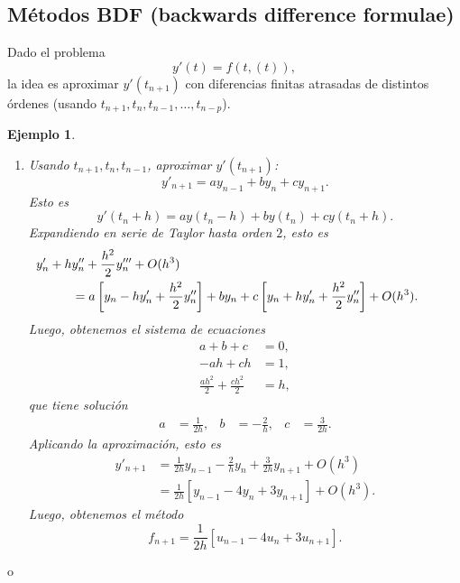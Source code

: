 \documentclass[11pt,letterpaper]{report}
\newtheorem{example}{Ejemplo}
\begin{document}
\subsection{Métodos BDF (backwards difference formulae)}

Dado el problema
\begin{equation}
  y'(t)=f(t,(t))
,\end{equation}
la idea es aproximar $y'(t_{n+1})$ con diferencias finitas atrasadas
de distintos órdenes (usando $t_{n+1},t_{n},t_{n-1},\dots,t_{n-p}$).

\begin{example}
  \begin{enumerate}
    \item
      Usando $t_{n+1},t_{n},t_{n-1}$, aproximar $y'(t_{n+1})$:
      \begin{equation}
        y'_{n+1} = ay_{n-1} + by_{n} + cy_{n+1}
      .\end{equation}
      Esto es
      \begin{equation}
        y'(t_{n}+h)
        = ay(t_{n}-h) + by(t_{n}) + cy(t_n+h)
      .\end{equation}
      Expandiendo en serie de Taylor hasta orden $2$, esto es
      \begin{align}
        &\hspace{-10mm}
        y'_n + hy''_n + \frac{h^{2}}{2}y'''_n + O(h^{3}) \\
        &= a \left[y_n - h y'_n + \frac{h^{2}}{2}y''_n\right]
        + b y_n
        + c \left[y_n + hy'_n + \frac{h^{2}}{2}y''_n\right]
        + O(h^{3})
      .\end{align}
      Luego, obtenemos el sistema de ecuaciones
      \begin{align}
        a+b+c &= 0, \\
        -ah+ch &= 1, \\
        \frac{ah^{2}}{2} + \frac{ch^{2}}{2} &= h,
      \end{align}
      que tiene solución
      \begin{align}
        a &= \frac{1}{2h}, &
        b &= -\frac{2}{h}, &
        c &= \frac{3}{2h}.
      \end{align}
      Aplicando la aproximación, esto es
      \begin{align}
        y'_{n+1}
        &= \frac{1}{2h}y_{n-1} - \frac{2}{h}y_n + \frac{3}{2h}y_{n+1}
        + O(h^{3})
        \\
        &= \frac{1}{2h}[y_{n-1} - 4y_n + 3y_{n+1}] + O(h^{3})
      .\end{align}
      Luego, obtenemos el método
      \begin{equation}
        f_{n+1} = \frac{1}{2h}[u_{n-1} - 4u_n + 3u_{n+1}]
      .\end{equation}
  \end{enumerate}
\end{example}o
\end{document}
